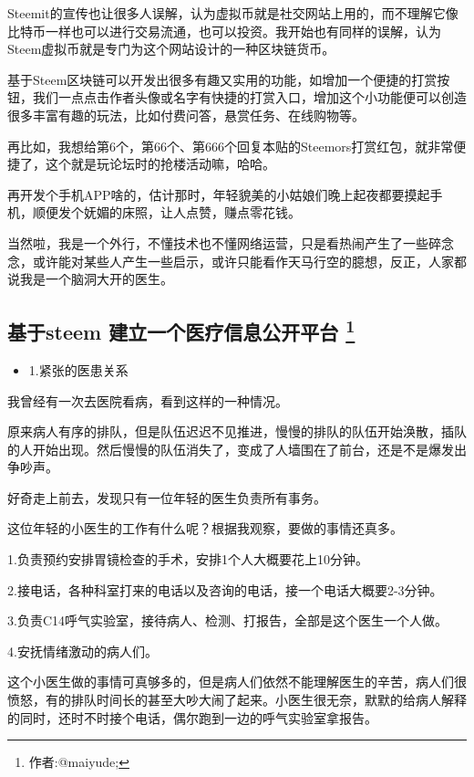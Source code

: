 \documentclass[]{ctexbook}
\providecommand{\tightlist}{%
  \setlength{\itemsep}{0pt}\setlength{\parskip}{0pt}}
\begin{document}
Steemit的宣传也让很多人误解，认为虚拟币就是社交网站上用的，而不理解它像比特币一样也可以进行交易流通，也可以投资。我开始也有同样的误解，认为Steem虚拟币就是专门为这个网站设计的一种区块链货币。

基于Steem区块链可以开发出很多有趣又实用的功能，如增加一个便捷的打赏按钮，我们一点点击作者头像或名字有快捷的打赏入口，增加这个小功能便可以创造很多丰富有趣的玩法，比如付费问答，悬赏任务、在线购物等。

再比如，我想给第6个，第66个、第666个回复本贴的Steemors打赏红包，就非常便捷了，这个就是玩论坛时的抢楼活动嘛，哈哈。

再开发个手机APP啥的，估计那时，年轻貌美的小姑娘们晚上起夜都要摸起手机，顺便发个妩媚的床照，让人点赞，赚点零花钱。

当然啦，我是一个外行，不懂技术也不懂网络运营，只是看热闹产生了一些碎念念，或许能对某些人产生一些启示，或许只能看作天马行空的臆想，反正，人家都说我是一个脑洞大开的医生。

\hypertarget{dev-medicine}{%
\subsection[基于steem 建立一个医疗信息公开平台 ]{\texorpdfstring{基于steem 建立一个医疗信息公开平台 \footnote{作者:@maiyude;}}{基于steem 建立一个医疗信息公开平台 }}\label{dev-medicine}}

\begin{itemize}
\tightlist
\item
  1.紧张的医患关系
\end{itemize}

我曾经有一次去医院看病，看到这样的一种情况。

原来病人有序的排队，但是队伍迟迟不见推进，慢慢的排队的队伍开始涣散，插队的人开始出现。然后慢慢的队伍消失了，变成了人墙围在了前台，还是不是爆发出争吵声。

好奇走上前去，发现只有一位年轻的医生负责所有事务。

这位年轻的小医生的工作有什么呢？根据我观察，要做的事情还真多。

1.负责预约安排胃镜检查的手术，安排1个人大概要花上10分钟。

2.接电话，各种科室打来的电话以及咨询的电话，接一个电话大概要2-3分钟。

3.负责C14呼气实验室，接待病人、检测、打报告，全部是这个医生一个人做。

4.安抚情绪激动的病人们。

这个小医生做的事情可真够多的，但是病人们依然不能理解医生的辛苦，病人们很愤怒，有的排队时间长的甚至大吵大闹了起来。小医生很无奈，默默的给病人解释的同时，还时不时接个电话，偶尔跑到一边的呼气实验室拿报告。
\end{document}
